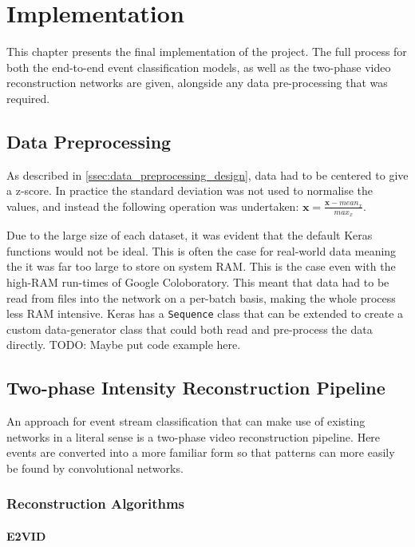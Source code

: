 \chapter{Implementation} \label{chap:implementation}

This chapter presents the final implementation of the project. The full process for both the end-to-end event classification models, as well as the two-phase video reconstruction networks are given, alongside any data pre-processing that was required.

\section{Data Preprocessing}

As described in  \cref{ssec:data_preprocessing_design}, data had to be centered to give a z-score. In practice the standard deviation was not used to normalise the values, and instead the following operation was undertaken: $ \textbf{x} = \frac{\textbf{x} - mean_x}{max_x} $. 

Due to the large size of each dataset, it was evident that the default Keras functions would not be ideal. This is often the case for real-world data meaning the it was far too large to store on system RAM. This is the case even with the high-RAM run-times of Google Coloboratory. This meant that data had to be read from files into the network on a per-batch basis, making the whole process less RAM intensive. Keras has a \lstinline{Sequence} class that can be extended to create a custom data-generator class that could both read and pre-process the data directly. \color{red} TODO: Maybe put code example here. \color{black}

\section{Two-phase Intensity Reconstruction Pipeline}

An approach for event stream classification that can make use of existing networks in a literal sense is a two-phase video reconstruction pipeline. Here events are converted into a more familiar form so that patterns can more easily be found by convolutional networks.

\subsection{Reconstruction Algorithms}

\subsubsection{E2VID}

